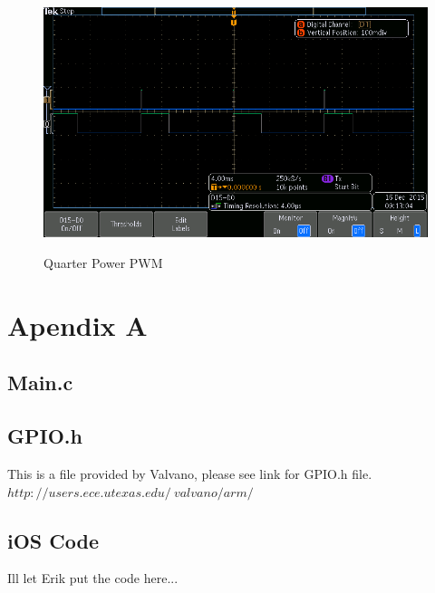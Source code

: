 \documentclass[12pt]{article}
\begin{document}
\begin{figure}[H]
\begin {center}
\includegraphics[scale=.75]{quarter-power}\\
\caption{Quarter Power PWM}
\end {center}
\end{figure}


\newpage
\section{Apendix A}
\subsection{Main.c}


\subsection{GPIO.h}
This is a file provided by Valvano, please see link for GPIO.h file.\\
$http://users.ece.utexas.edu/~valvano/arm/$\\


\subsection{iOS Code}
Ill let Erik put the code here...
\end{document}
